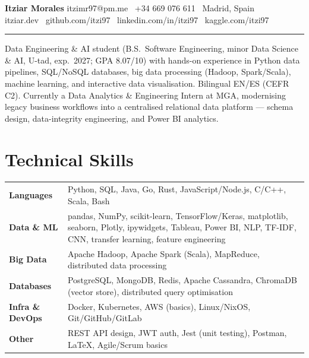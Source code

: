\documentclass[10pt,a4paper]{article}
\begin{document}
{\LARGE\bfseries Itziar Morales}\hfill
{\small itzimr97@pm.me \textbar\ +34 669 076 611 \textbar\ Madrid, Spain}\\
{\small
  itziar.dev \textbar\
  github.com/itzi97 \textbar\
  linkedin.com/in/itzi97 \textbar\
  kaggle.com/itzi97
}
\vspace{3pt}\hrule\vspace{5pt}

{\small
Data Engineering \& AI student (B.S.~Software Engineering, minor Data Science \& AI, U-tad, exp.\ 2027;
GPA 8.07/10) with hands-on experience in Python data pipelines, SQL/NoSQL databases, big data processing
(Hadoop, Spark/Scala), machine learning, and interactive data visualisation.
Bilingual EN/ES (CEFR C2). Currently a Data Analytics \& Engineering Intern at MGA, modernising legacy
business workflows into a centralised relational data platform --- schema design, data-integrity
engineering, and Power BI analytics.
}
\vspace{3pt}

\section{Technical Skills}
{\small
\begin{tabularx}{\linewidth}{@{} l X @{}}
  \textbf{Languages} &
    Python, SQL, Java, Go, Rust, JavaScript/Node.js, C/C++, Scala, Bash \\
  \textbf{Data \& ML} &
    pandas, NumPy, scikit-learn, TensorFlow/Keras, matplotlib, seaborn,
    Plotly, ipywidgets, Tableau, Power BI, NLP, TF-IDF, CNN, transfer learning, feature engineering \\
  \textbf{Big Data} &
    Apache Hadoop, Apache Spark (Scala), MapReduce, distributed data processing \\
  \textbf{Databases} &
    PostgreSQL, MongoDB, Redis, Apache Cassandra, ChromaDB (vector store), distributed query optimisation \\
  \textbf{Infra \& DevOps} &
    Docker, Kubernetes, AWS (basics), Linux/NixOS, Git/GitHub/GitLab \\
  \textbf{Other} &
    REST API design, JWT auth, Jest (unit testing), Postman, LaTeX, Agile/Scrum basics \\
\end{tabularx}
}

\end{document}
